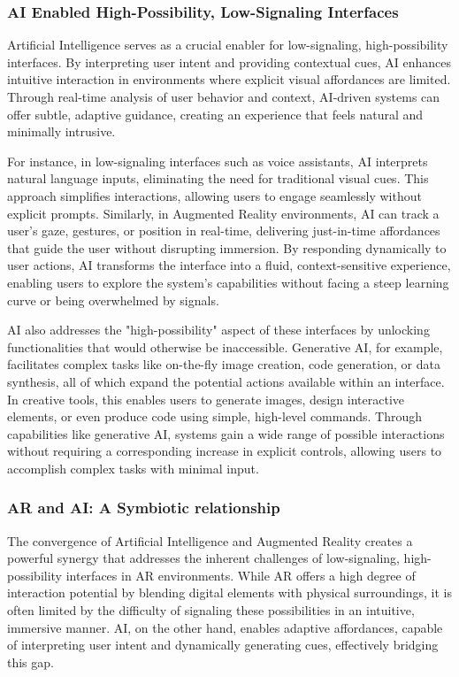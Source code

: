 \subsubsection{ AI Enabled High-Possibility, Low-Signaling Interfaces}

Artificial Intelligence serves as a crucial enabler for low-signaling, high-possibility interfaces\cite{neches1986intelligence}.
By interpreting user intent and providing contextual cues, AI enhances intuitive interaction in environments where explicit visual affordances are limited\cite{9820378}.
Through real-time analysis of user behavior and context, AI-driven systems can offer subtle, adaptive guidance, creating an experience that feels natural and minimally intrusive.

For instance, in low-signaling interfaces such as voice assistants, AI interprets natural language inputs, eliminating the need for traditional visual cues.
This approach simplifies interactions, allowing users to engage seamlessly without explicit prompts.
Similarly, in Augmented Reality environments, AI can track a user’s gaze, gestures, or position in real-time, delivering just-in-time affordances that guide the user without disrupting immersion.
By responding dynamically to user actions, AI transforms the interface into a fluid, context-sensitive experience, enabling users to explore the system’s capabilities without facing a steep learning curve or being overwhelmed by signals.

AI also addresses the "high-possibility" aspect of these interfaces by unlocking functionalities that would otherwise be inaccessible.
Generative AI, for example, facilitates complex tasks like on-the-fly image creation, code generation, or data synthesis, all of which expand the potential actions available within an interface.
In creative tools, this enables users to generate images, design interactive elements, or even produce code using simple, high-level commands.
Through capabilities like generative AI, systems gain a wide range of possible interactions without requiring a corresponding increase in explicit controls, allowing users to accomplish complex tasks with minimal input.

\subsubsection{ AR and AI: A Symbiotic relationship}

The convergence of Artificial Intelligence and Augmented Reality creates a powerful synergy that addresses the inherent challenges of low-signaling, high-possibility interfaces in AR environments.
While AR offers a high degree of interaction potential by blending digital elements with physical surroundings, it is often limited by the difficulty of signaling these possibilities in an intuitive, immersive manner.
AI, on the other hand, enables adaptive affordances, capable of interpreting user intent and dynamically generating cues, effectively bridging this gap.

